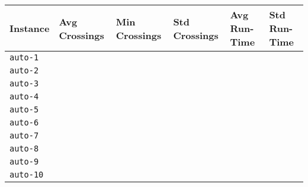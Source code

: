 \documentclass{scrartcl}
\begin{document}
\begin{table}[!H]
\scriptsize
\centering
\begin{tabular}{llllll}
\toprule
Instance & Avg Crossings & Min Crossings & Std Crossings & Avg Run-Time & Std Run-Time \\
\midrule
\texttt{auto-1} & & & & & \\
\texttt{auto-2} & & & & & \\
\texttt{auto-3} & & & & & \\
\texttt{auto-4} & & & & & \\
\texttt{auto-5} & & & & & \\
\texttt{auto-6} & & & & & \\
\texttt{auto-7} & & & & & \\
\texttt{auto-8} & & & & & \\
\texttt{auto-9} & & & & & \\
\texttt{auto-10} & & & & & \\
\bottomrule

\end{tabular}

\end{table}

\clearpage
\end{document}
